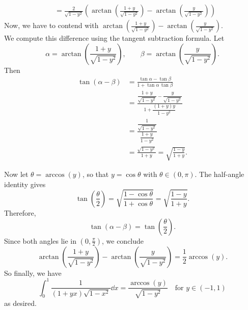 \begin{solution}
\begin{align*}
        &=  \frac{2}{\sqrt{1-y^{2}}} \left( \arctan{ \left( \frac{1+y}{\sqrt{1-y^{2}}} \right) } - \arctan{ \left( \frac{y}{\sqrt{1-y^{2}}} \right) }\right)
    \end{align*}
    Now, we have to contend with \(  \arctan{ \left( \frac{1+y}{\sqrt{1-y^{2}}} \right) } - \arctan{ \left( \frac{y}{\sqrt{1-y^{2}}} \right) } \).\\
We compute this difference using the tangent subtraction formula. Let
\[
\alpha = \arctan\!\left( \frac{1+y}{\sqrt{1-y^{2}}} \right),
\qquad
\beta = \arctan\!\left( \frac{y}{\sqrt{1-y^{2}}} \right).
\]
Then
\begin{align*}
\tan(\alpha - \beta)
&= \frac{\tan\alpha - \tan\beta}{1 + \tan\alpha\,\tan\beta} \\
&= \frac{\dfrac{1+y}{\sqrt{1-y^2}} - \dfrac{y}{\sqrt{1-y^2}}}
{1 + \dfrac{(1+y)y}{1-y^2}} \\
&= \frac{ \dfrac{1}{\sqrt{1-y^2}} }
{ \dfrac{1+y}{1-y^2} } \\
&= \frac{\sqrt{1-y^2}}{1+y}
= \sqrt{ \frac{1-y}{1+y} }.
\end{align*}

Now let \( \theta = \arccos(y) \), so that \( y = \cos\theta \) with \( \theta \in (0,\pi) \).  
The half-angle identity gives
\[
\tan\!\left( \frac{\theta}{2} \right)
= \sqrt{ \frac{1-\cos\theta}{1+\cos\theta} }
= \sqrt{ \frac{1-y}{1+y} }.
\]
Therefore,
\[
\tan(\alpha - \beta) = \tan\!\left( \frac{\theta}{2} \right).
\]
Since both angles lie in \( (0,\tfrac{\pi}{2}) \), we conclude
\[
\arctan\!\left( \frac{1+y}{\sqrt{1-y^{2}}} \right)
- \arctan\!\left( \frac{y}{\sqrt{1-y^{2}}} \right)
= \frac{1}{2}\arccos(y).
\]
So finally, we have 
 \[ \int_{0 }^{1} \frac{1}{\left( 1+yx \right) \sqrt{1-x^{2}}} \dd{x} = \frac{ \arccos{ \left( y \right) }}{\sqrt{1-y^{2}}} \quad \text{for } y \in \left( -1,1 \right) \]
 as desired. 
\end{solution}

